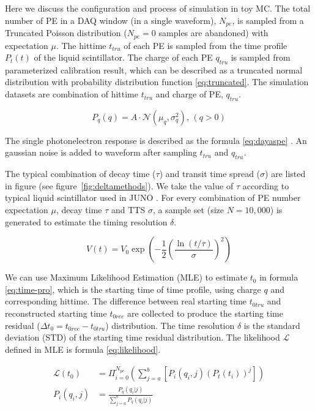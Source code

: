 Here we discuss the configuration and process of simulation in toy MC. The total number of PE in a DAQ window (in a single waveform), $N_{pe}$, is sampled from a Truncated Poisson distribution ($N_{pe}=0$ samples are abandoned) with expectation $\mu$. The hittime $t_{tru}$ of each PE is sampled from the time profile $P_{t}(t)$ of the liquid scintillator. The charge of each PE $q_{tru}$ is sampled from parameterized calibration result, which can be described as a truncated normal distribution with probability distribution function \eqref{eq:truncated}. The simulation datasets are combination of hittime $t_{tru}$ and charge of PE, $q_{tru}$. 

\begin{equation}
    P_{q}(q) = A\cdot\mathcal{N}(\mu_{q},\sigma_{q}^{2}),\,(q>0)
    \label{eq:truncated}
\end{equation}

The single photonelectron response is described as the formula \eqref{eq:dayaspe} \cite{jetter_pmt_2012}. An gaussian noise is added to waveform after sampling $t_{tru}$ and $q_{tru}$. 

The typical combination of decay time ($\tau$) and transit time spread ($\sigma$) are listed in figure (see figure~\ref{fig:deltamethods}). We take the value of $\tau$ according to typical liquid scintillator used in JUNO \cite{ludhova_particle_2020}. For every combination of PE number expectation $\mu$, decay time $\tau$ and TTS $\sigma$, a sample set (size $N=10,000$) is generated to estimate the timing resolution $\delta$. 

\begin{equation}
    V(t) = V_{0}\exp\left(-\frac{1}{2}\left(\frac{\ln(t/\tau)}{\sigma}\right)^{2}\right)
    \label{eq:dayaspe}
\end{equation}

We can use Maximum Likelihood Estimation (MLE) to estimate $t_{0}$ in formula \eqref{eq:time-pro}, which is the starting time of time profile, using charge $q$ and corresponding hittime. The difference between real starting time $t_{0tru}$ and reconstructed starting time $t_{0rec}$ are collected to produce the starting time residual ($\Delta t_{0}=t_{0rec}-t_{0tru}$) distribution. The time resolution $\delta$ is the standard deviation (STD) of the starting time residual distribution. The likelihood $\mathcal{L}$ defined in MLE is formula \eqref{eq:likelihood}. 

\begin{align}
    \mathcal{L}(t_{0}) &= \Pi_{i=0}^{N_{pe}}\left(\sum_{j=a}^{b}[P_{i}(q_{i},j)(P_{t}(t_{i}))^{j}]\right)
    \label{eq:likelihood} \\
    P_{i}(q_{i},j) &= \frac{P_{q}(q_{i}|j)}{\sum_{j=a}^{b}P_{q}(q_{i}|j)}
\end{align}

